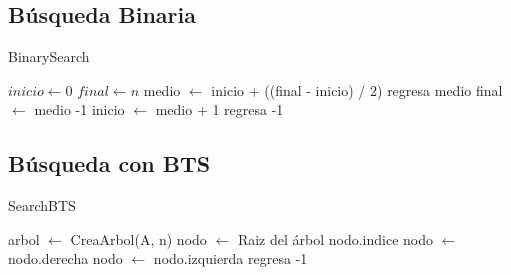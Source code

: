 \documentclass[12pt, fleqn]{article}                             %
\theoremstyle{break}                                            %
\begin{document}
    \subsection{Búsqueda Binaria}
        \begin{algorithm}[H]
        \caption{BinarySearch}
        \begin{algorithmic}[1]
            \State $inicio \gets 0$
            \State $final \gets n$
               \State medio $\gets$ inicio + ((final - inicio) / 2)
                    \State regresa medio
                \EndIf
                    \State final $\gets$ medio -1
                \EndIf
                    \State inicio $\gets$ medio + 1
                \EndIf
            \EndWhile
            regresa -1
            \EndProcedure
            \end{algorithmic}
        \end{algorithm}
        
    \subsection{Búsqueda con BTS}
        \begin{algorithm}[H]
        \caption{SearchBTS}
        \begin{algorithmic}[1]
            \State arbol $\gets$ CreaArbol(A, n)
            \State nodo $\gets$ Raiz del árbol
                    \State nodo.indice
                \EndIf
                    \State nodo $\gets$ nodo.derecha
                \EndIf
                    \State nodo $\gets$ nodo.izquierda
                \EndIf
            \EndWhile
            regresa -1
            \EndProcedure
            \end{algorithmic}
        \end{algorithm}




\clearpage
\end{document}
